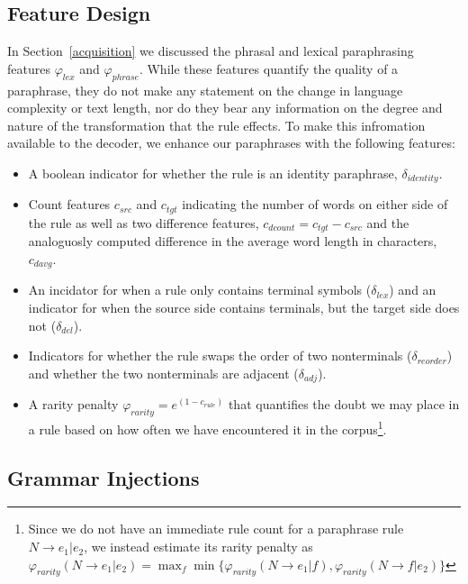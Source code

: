 \documentclass[11pt]{article}
\begin{document}
\subsection{Feature Design}
In Section~\ref{acquisition} we discussed the phrasal and lexical
paraphrasing features $\varphi_{\mathit{lex}}$ and
$\varphi_{\mathit{phrase}}$. While these features quantify the quality
of a paraphrase, they do not make any statement on the change in
language complexity or text length, nor do they bear any information
on the degree and nature of the transformation that the rule
effects. To make this infromation available to the decoder, we enhance
our paraphrases with the following features:
\begin{itemize}
\item A boolean indicator for whether the rule is an identity
  paraphrase, $\delta_{\mathit{identity}}$.

\item Count features $c_{\mathit{src}}$ and $c_{\mathit{tgt}}$
  indicating the number of words on either side of the rule as well as
  two difference features, $c_{\mathit{dcount}} = c_{\mathit{tgt}} -
  c_{\mathit{src}}$ and the analoguosly computed difference in the
  average word length in characters, $c_{\mathit{davg}}$.

\item An incidator for when a rule only contains terminal symbols
  ($\delta_{\mathit{lex}}$) and an indicator for when the source side
  contains terminals, but the target side does not
  ($\delta_{\mathit{del}}$).

\item Indicators for whether the rule swaps the order of two
  nonterminals ($\delta_{\mathit{reorder}}$) and whether the two
  nonterminals are adjacent ($\delta_{\mathit{adj}}$).

\item A rarity penalty $\varphi_{\mathit{rarity}} =
  e^{(1-c_{\mathit{rule}})}$ that quantifies the doubt we may place in
  a rule based on how often we have encountered it in the
  corpus\footnote{Since we do not have an immediate rule count for a
    paraphrase rule $N \rightarrow e_1 | e_2$, we instead estimate
    its rarity penalty as $\varphi_{\mathit{rarity}}(N
    \rightarrow e_1 | e_2) = \max_{f} \min
    \{\varphi_{\mathit{rarity}}(N \rightarrow e_1 | f),
    \varphi_{\mathit{rarity}}(N \rightarrow f | e_2) \}$}.
\end{itemize}

\subsection{Grammar Injections} \label{injection}
\end{document}
